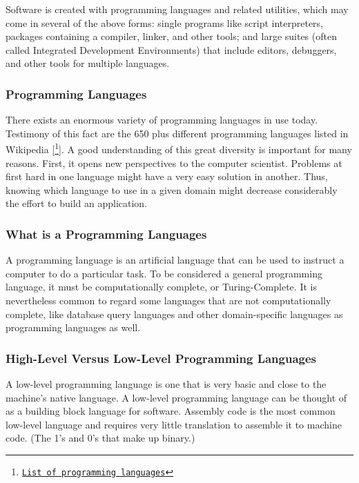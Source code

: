 Software is created with programming languages and related utilities, which may come in several of the above forms: single programs like script interpreters, packages containing a compiler, linker, and other tools; and large suites (often called Integrated Development Environments) that include editors, debuggers, and other tools for multiple languages. 
\newline

\subsubsection*{Programming Languages}
There exists an enormous variety of programming languages in use today. Testimony of this fact are the 650 plus different programming languages listed in Wikipedia [\footnote{\href{http://en.wikipedia.org/wiki/List\_of\_programming\_languages}{\texttt{List of programming languages}}}]. A good understanding of this great diversity is important for many reasons. First, it opens new perspectives to the computer scientist. Problems at first hard in one language might have a very easy solution in another. Thus, knowing which language to use in a given domain might decrease considerably the effort to build an application.


\subsubsection*{What is a Programming Languages}
A programming language is an artificial language that can be used to instruct a computer to do a particular task. To be considered a general programming language, it must be computationally complete, or Turing-Complete. It is nevertheless common to regard some languages that are not computationally complete, like database query languages and other domain-specific languages as programming languages as well.

\subsubsection*{High-Level Versus Low-Level Programming Languages}

A low-level programming language is one that is very basic and close to the machine's native language. A low-level programming language can be thought of as a building block language for software. Assembly code is the most common low-level language and requires very little translation to assemble it to machine code. (The 1's and 0's that make up binary.)
\newline

